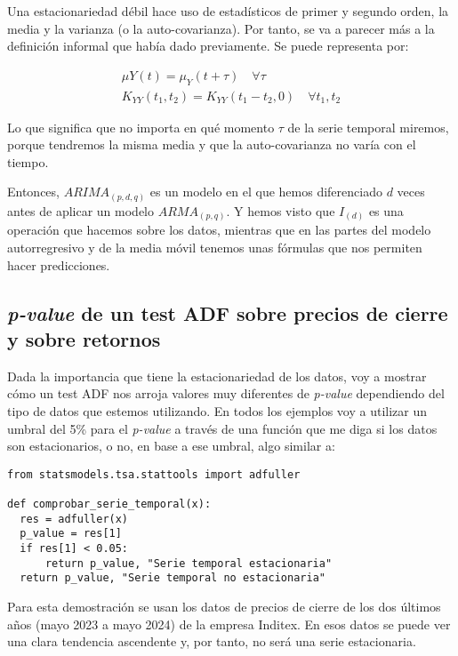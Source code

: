 Una estacionariedad débil hace uso de estadísticos de primer y segundo orden, la media y la varianza (o la auto-covarianza). Por tanto, se va a parecer más a la definición informal que había dado previamente. Se puede representa por:

\begin{align}
	\mu{Y}(t) = \mu_{Y}(t + \tau) \quad \forall \tau \\
	K_{YY}(t_{1},t_{2}) = K_{YY}(t_{1} - t_{2}, 0) \quad \forall t_{1}, t_{2}
\end{align}

Lo que significa que no importa en qué momento $\tau$ de la serie temporal miremos, porque tendremos la misma media y que la auto-covarianza no varía con el tiempo.

Entonces, $ARIMA_{(p, d, q)}$ es un modelo en el que hemos diferenciado $d$ veces antes de aplicar un modelo $ARMA_{(p, q)}$. Y hemos visto que $I_{(d)}$ es una operación que hacemos sobre los datos, mientras que en las partes del modelo autorregresivo y de la media móvil tenemos unas fórmulas que nos permiten hacer predicciones. 


\subsection{\emph{p-value} de un test ADF sobre precios de cierre y sobre retornos}

Dada la importancia que tiene la estacionariedad de los datos, voy a mostrar cómo un test ADF nos arroja valores muy diferentes de \emph{p-value} dependiendo del tipo de datos que estemos utilizando. En todos los ejemplos voy a utilizar un umbral del 5\% para el \emph{p-value} a través de una función que me diga si los datos son estacionarios, o no, en base a ese umbral, algo similar a:

\begin{verbatim}
from statsmodels.tsa.stattools import adfuller

def comprobar_serie_temporal(x):
  res = adfuller(x)
  p_value = res[1]
  if res[1] < 0.05:
  	  return p_value, "Serie temporal estacionaria"
  return p_value, "Serie temporal no estacionaria"
\end{verbatim}

Para esta demostración se usan los datos de precios de cierre de los dos últimos años (mayo 2023 a mayo 2024) de la empresa Inditex. En esos datos se puede ver una clara tendencia ascendente y, por tanto, no será una serie estacionaria. 

